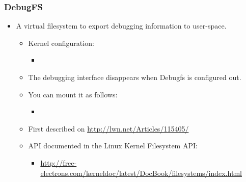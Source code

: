 \begin{frame}
  \frametitle{DebugFS}
  \begin{itemize}
  \item A virtual filesystem to export debugging information to
    user-space.
    \begin{itemize}
    \item Kernel configuration: 
      \begin{itemize}
      \item {}
      \end{itemize}
    \item The debugging interface disappears when Debugfs is
      configured out.
    \item You can mount it as follows:
      \begin{itemize}
      \item {}
      \end{itemize}
    \item First described on \url{http://lwn.net/Articles/115405/}
    \item API documented in the Linux Kernel Filesystem API:
      \begin{itemize}
      \item \url{http://free-electrons.com/kerneldoc/latest/DocBook/filesystems/index.html}
      \end{itemize}
    \end{itemize}
  \end{itemize}
\end{frame}

